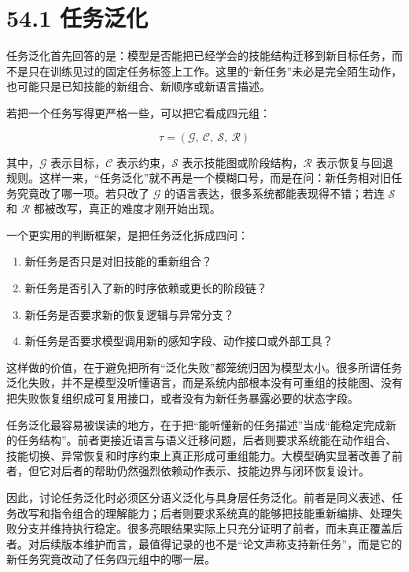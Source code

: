 \section*{54.1 任务泛化}


任务泛化首先回答的是：模型是否能把已经学会的技能结构迁移到新目标任务，而不是只在训练见过的固定任务标签上工作。这里的“新任务”未必是完全陌生动作，也可能只是已知技能的新组合、新顺序或新语言描述。

若把一个任务写得更严格一些，可以把它看成四元组：

\begingroup
\footnotesize
\begin{equation*}
\tau = (\mathcal{G},\ \mathcal{C},\ \mathcal{S},\ \mathcal{R})
\end{equation*}
\endgroup

其中，\(\mathcal{G}\) 表示目标，\(\mathcal{C}\) 表示约束，\(\mathcal{S}\) 表示技能图或阶段结构，\(\mathcal{R}\) 表示恢复与回退规则。这样一来，“任务泛化”就不再是一个模糊口号，而是在问：新任务相对旧任务究竟改了哪一项。若只改了 \(\mathcal{G}\) 的语言表达，很多系统都能表现得不错；若连 \(\mathcal{S}\) 和 \(\mathcal{R}\) 都被改写，真正的难度才刚开始出现。

一个更实用的判断框架，是把任务泛化拆成四问：

\begin{enumerate}
\item 新任务是否只是对旧技能的重新组合？
\item 新任务是否引入了新的时序依赖或更长的阶段链？
\item 新任务是否要求新的恢复逻辑与异常分支？
\item 新任务是否要求模型调用新的感知字段、动作接口或外部工具？
\end{enumerate}

这样做的价值，在于避免把所有“泛化失败”都笼统归因为模型太小。很多所谓任务泛化失败，并不是模型没听懂语言，而是系统内部根本没有可重组的技能图、没有把失败恢复组织成可复用接口，或者没有为新任务暴露必要的状态字段。

任务泛化最容易被误读的地方，在于把“能听懂新的任务描述”当成“能稳定完成新的任务结构”。前者更接近语言与语义迁移问题，后者则要求系统能在动作组合、技能切换、异常恢复和时序约束上真正形成可重组能力。大模型确实显著改善了前者，但它对后者的帮助仍然强烈依赖动作表示、技能边界与闭环恢复设计。

因此，讨论任务泛化时必须区分语义泛化与具身层任务泛化。前者是同义表述、任务改写和指令组合的理解能力；后者则要求系统真的能够把技能重新编排、处理失败分支并维持执行稳定。很多亮眼结果实际上只充分证明了前者，而未真正覆盖后者。对后续版本维护而言，最值得记录的也不是“论文声称支持新任务”，而是它的新任务究竟改动了任务四元组中的哪一层。

